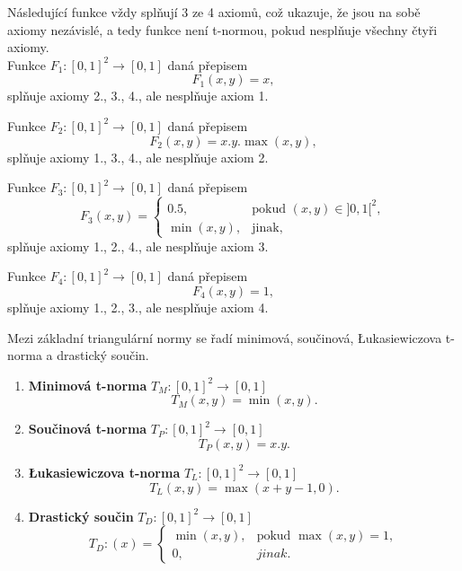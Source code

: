 \begin{example} N\'asleduj\'ic\'i funkce vždy spl\v nují 3 ze 4  axiom\r u, což ukazuje, že jsou na sobě axiomy nez\' avislé, a tedy funkce není t-normou, pokud nespl\v nuje všechny čtyři axiomy.\\ 
    Funkce $F_1 : [0, 1]^2 \to [0, 1]$ daná přepisem
    $$F_1(x,y) = x,$$
    spl\v nuje axiomy 2., 3., 4., ale nespl\v nuje axiom 1.
    
    Funkce $F_2 : [0, 1]^2 \to [0, 1]$ daná přepisem
    $$F_2(x,y) = x.y.\max(x,y),$$
    spl\v nuje axiomy 1., 3., 4., ale nespl\v nuje axiom 2.

    Funkce $F_3 : [0, 1]^2 \to [0, 1]$ daná přepisem
    $$ F_3(x,y)=\begin{cases} 0.5, & \mbox{pokud }(x, y) \in ]0,1[^2, \\
         \min(x,y), & \mbox{jinak,}\end{cases} $$
    spl\v nuje axiomy 1., 2., 4., ale nespl\v nuje axiom 3.
    
    Funkce $F_4 : [0, 1]^2 \to [0, 1]$ daná přepisem
    $$F_4(x,y) = 1,$$
    spl\v nuje axiomy 1., 2., 3., ale nespl\v nuje axiom 4.

  \end{example}

Mezi základní triangulární normy se řadí minimová, součinová, Łukasiewiczova t-norma a drastický součin.
\begin{example}
\cite{KMP}
    \begin{enumerate}
    \item \textbf{Minimová t-norma} $T_M: [0,1]^2 \rightarrow [0,1]$
    $$T_M(x,y) = \min(x,y).$$
    \item \textbf{Součinová t-norma} $T_P: [0,1]^2 \rightarrow [0,1]$
    $$T_P(x,y) = x.y.$$
    \item \textbf{Łukasiewiczova t-norma} $T_L: [0,1]^2 \rightarrow [0,1]$
    $$T_L(x,y) = \max(x+y-1,0).$$
    \item \textbf{Drastický součin} $T_D: [0,1]^2 \rightarrow [0,1]$
    $$T_D:(x)=\begin{cases} \min(x,y), & \mbox{pokud }  \max(x,y) = 1,\\ 
    0, &  jinak.  \end{cases}$$\\
\end{enumerate}
\end{example}



